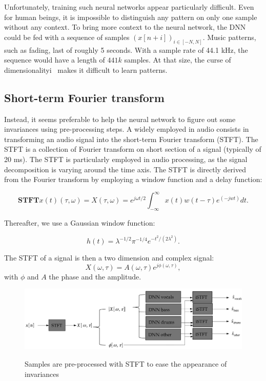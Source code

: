 Unfortunately, training such neural networks appear particularly difficult. 
Even for human beings, it is impossible to distinguish any pattern on only one sample without any context.
To bring more context to the neural network, the DNN could be fed with a sequence of samples $(x[n+i])_{i\in [-N, N]}$.
Music patterns, such as fading, last of roughly 5 seconds. With a sample rate of 44.1 kHz, the sequence would have a length of $441k$ samples. 
At that size, the curse of dimensionalityi~\cite{mallat} makes it difficult to learn patterns.


\subsection{Short-term Fourier transform}

Instead, it seems preferable to help the neural network to figure out some invariances using pre-processing steps. 
A widely employed in audio consists in transforming an audio signal into the short-term Fourier transform (STFT). The STFT is a collection of Fourier transform on short section of a signal (typically of 20 ms). The STFT is particularly employed in audio processing, as the signal decomposition is varying around the time axis. 
The STFT is directly derived from the Fourier transform by employing a window function and a delay function:

$$\mathbf{STFT}{x(t)}(\tau,\omega) = X(\tau,\omega) = e^{j\omega t/2}\int_{-\infty}^\infty {x(t)w(t-\tau)e^(-jwt)dt}.$$

Thereafter, we use a Gaussian window function:

$$h(t) = \lambda^{-1/2}\pi^{-1/4}e^{-t^2/(2\lambda^2)}.$$

The STFT of a signal is then a two dimension and complex signal:
$$X(\omega, \tau) = A(\omega, \tau) e^{j\phi(\omega, \tau)},$$
with $\phi$ and $A$ the phase and the amplitude.


\begin{figure}
  \centering
  \includegraphics[width=0.9\columnwidth]{mss-amp.png}
  \label{fig:mss-amp}
  \caption{Samples are pre-processed with STFT to ease the appearance of invariances}
\end{figure}

